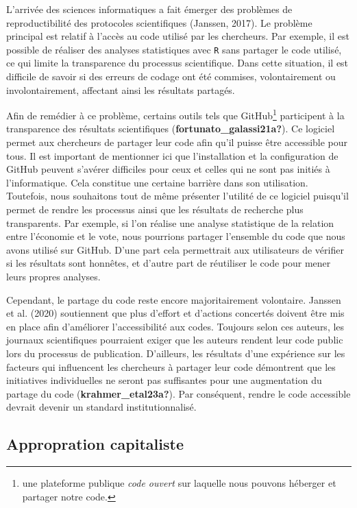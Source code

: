 \documentclass[
  letterpaper,
  DIV=11,
  numbers=noendperiod]{scrreprt}
\begin{document}
L'arrivée des sciences informatiques a fait émerger des problèmes de
reproductibilité des protocoles scientifiques (Janssen, 2017). Le
problème principal est relatif à l'accès au code utilisé par les
chercheurs. Par exemple, il est possible de réaliser des analyses
statistiques avec \texttt{R} sans partager le code utilisé, ce qui
limite la transparence du processus scientifique. Dans cette situation,
il est difficile de savoir si des erreurs de codage ont été commises,
volontairement ou involontairement, affectant ainsi les résultats
partagés.

Afin de remédier à ce problème, certains outils tels que
GitHub\footnote{une plateforme publique \emph{code ouvert} sur laquelle
  nous pouvons héberger et partager notre code.} participent à la
transparence des résultats scientifiques
(\textbf{fortunato\_galassi21a?}). Ce logiciel permet aux chercheurs de
partager leur code afin qu'il puisse être accessible pour tous. Il est
important de mentionner ici que l'installation et la configuration de
GitHub peuvent s'avérer difficiles pour ceux et celles qui ne sont pas
initiés à l'informatique. Cela constitue une certaine barrière dans son
utilisation. Toutefois, nous souhaitons tout de même présenter l'utilité
de ce logiciel puisqu'il permet de rendre les processus ainsi que les
résultats de recherche plus transparents. Par exemple, si l'on réalise
une analyse statistique de la relation entre l'économie et le vote, nous
pourrions partager l'ensemble du code que nous avons utilisé sur GitHub.
D'une part cela permettrait aux utilisateurs de vérifier si les
résultats sont honnêtes, et d'autre part de réutiliser le code pour
mener leurs propres analyses.

Cependant, le partage du code reste encore majoritairement volontaire.
Janssen et al. (2020) soutiennent que plus d'effort et d'actions
concertés doivent être mis en place afin d'améliorer l'accessibilité aux
codes. Toujours selon ces auteurs, les journaux scientifiques pourraient
exiger que les auteurs rendent leur code public lors du processus de
publication. D'ailleurs, les résultats d'une expérience sur les facteurs
qui influencent les chercheurs à partager leur code démontrent que les
initiatives individuelles ne seront pas suffisantes pour une
augmentation du partage du code (\textbf{krahmer\_etal23a?}). Par
conséquent, rendre le code accessible devrait devenir un standard
institutionnalisé.

\subsection{Appropration capitaliste}\label{appropration-capitaliste}
\end{document}
